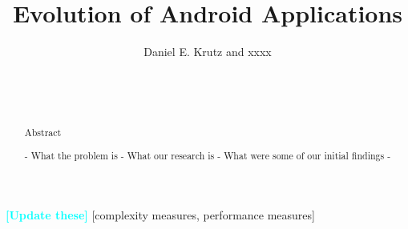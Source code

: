 \documentclass{sig-alternate}
\newcommand{\todo}[1]{\textcolor{cyan}{\textbf{[#1]}}}
\begin{document}

\title{Evolution of Android Applications}

%
\author{
%
%
\alignauthor
Daniel E. Krutz and xxxx\\
       \\
       \\
       \\
}


\maketitle
\begin{abstract}

Abstract

- What the problem is
- What our research is
- What were some of our initial findings
-




\end{abstract}

\todo{Update these}
[complexity measures, performance measures]
\end{document}
